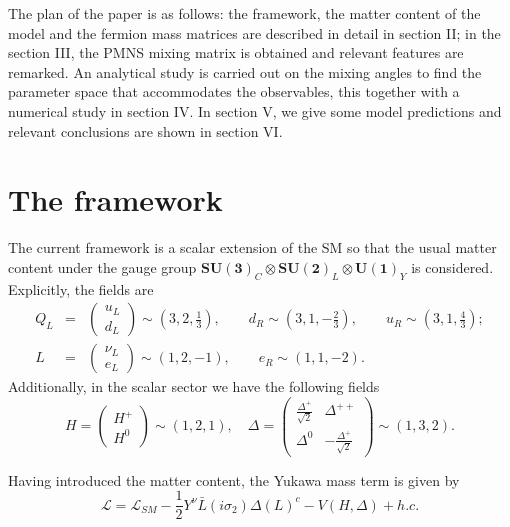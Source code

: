 \documentclass[aps,prd,groupaddress,floatfix,tighten,nofootinbib,showpacs,amsfonts,superscriptaddress]{revtex4-2}
\newcommand{\nn}{\nonumber}
\begin{document}
The plan of the paper is as follows: the framework, the matter content of the model and the fermion mass matrices are described in detail in section II; in the section III, the PMNS mixing matrix is obtained and relevant features are remarked. An analytical study is carried out on the mixing angles to find the parameter space that accommodates the observables, this together with a numerical study in section IV. In section V, we give some model predictions and relevant conclusions are shown in section VI. 









\section{The framework}

The current framework is a scalar extension of the SM so that the usual matter content under the gauge group $\mathbf{SU(3)}_{C}\otimes \mathbf{SU(2)}_{L} \otimes \mathbf{U(1)}_{Y}$ is considered. Explicitly, the fields are
\begin{eqnarray}
Q_{L}&=&\begin{pmatrix}
u_{L}\\ d_{L}
\end{pmatrix}\sim \left(3, 2, \frac{1}{3}\right), \qquad d_{R}\sim \left(3, 1,-\frac{2}{3}\right),\qquad u_{R}\sim \left(3, 1,\frac{4}{3}\right);\nn\\
L&=&\begin{pmatrix}
\nu_{L}\\ e_{L}
\end{pmatrix}\sim \left(1, 2,-1\right),\qquad e_{R}\sim \left(1, 1,-2\right).
\end{eqnarray}
Additionally, in the scalar sector we have the following fields
\begin{equation}\label{scal}
H=\begin{pmatrix}
H^{+}\\ H^{0}
\end{pmatrix}\sim \left(1, 2, 1\right),\quad \Delta= \left( 
\begin{array}{cc}
\frac{\Delta ^{+}}{\sqrt{2}} & \Delta ^{++} \\ 
\Delta^{0} & -\frac{\Delta ^{+}}{\sqrt{2}}%
\end{array}%
\right)\sim \left(1, 3, 2\right).
\end{equation}

Having introduced the matter content, the Yukawa mass term is given by
\begin{equation}
\mathcal{L}=\mathcal{L}_{SM}-\frac{1}{2}Y^{\nu}\bar{L}(i\sigma_{2})\Delta \left(L\right)^{c}-V(H,\Delta)+h.c.
\end{equation}
\end{document}
